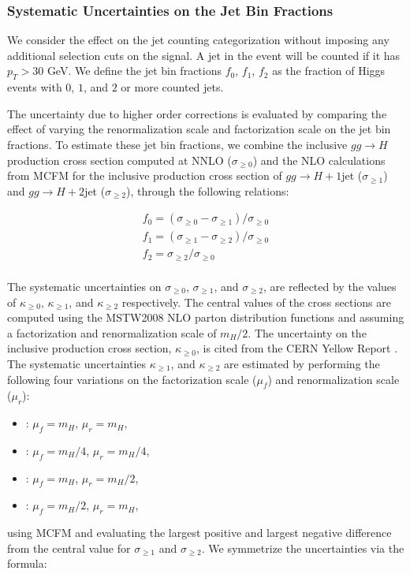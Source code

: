 \subsubsection{Systematic Uncertainties on the Jet Bin Fractions}
\label{sec:HiggsJetBinFractionSystematics}
We consider the effect on the jet counting categorization without imposing any additional
selection cuts on the signal. A jet in the event will be counted if it has $p_{T} > 30$ GeV. 
We define the jet bin fractions $f_{0}$, $f_{1}$, $f_{2}$
as the fraction of Higgs events with $0$, $1$, and $2$ or more counted jets. 

The uncertainty due to higher order corrections is evaluated by comparing the effect of
varying the renormalization scale and factorization scale on the jet bin fractions. To 
estimate these jet bin fractions, we combine the inclusive $gg \to H$ production cross section
computed at NNLO \cite{LHCHiggsCrossSectionWorkingGroup:2011ti} ($\sigma_{\geq 0}$) and the 
NLO calculations from MCFM \cite{MCFMHiggsProduction} for the inclusive production cross section 
of $gg \to H+1$jet ($\sigma_{\geq 1}$) and $gg \to H+2$jet ($\sigma_{\geq 2}$), 
through the following relations:

\begin{eqnarray}
\label{eqn:jetBinFractions}
  f_{0} = (\sigma_{\geq 0} - \sigma_{\geq 1} ) / \sigma_{\geq 0} \\
  f_{1} = (\sigma_{\geq 1} - \sigma_{\geq 2} ) / \sigma_{\geq 0} \\
  f_{2} = \sigma_{\geq 2} / \sigma_{\geq 0} \\
\end{eqnarray}

The systematic uncertainties on $\sigma_{\geq 0}$, $\sigma_{\geq 1}$, and $\sigma_{\geq 2}$, are reflected by 
the values of $\kappa_{\geq 0}$, $\kappa_{\geq 1}$, and $\kappa_{\geq 2}$ respectively. 
The central values of the cross sections are computed  using the MSTW2008 NLO parton distribution functions and 
assuming a factorization and renormalization scale of $m_{H} / 2$. The uncertainty on the inclusive
production cross section, $\kappa_{\geq 0}$, is cited from the CERN Yellow Report 
\cite{LHCHiggsCrossSectionWorkingGroup:2011ti}.  The systematic uncertainties
$\kappa_{\geq 1}$, and $\kappa_{\geq 2}$ are estimated by performing the following four variations on
the factorization scale ($\mu_{f}$) and renormalization scale ($\mu_{r}$):

\begin{itemize}
\item: $\mu_{f} = m_{H} $, $\mu_{r} = m_{H}$,
\item: $\mu_{f} = m_{H} / 4$, $\mu_{r} = m_{H} / 4$,
\item: $\mu_{f} = m_{H} $, $\mu_{r} = m_{H} / 2$,
\item: $\mu_{f} = m_{H} / 2$, $\mu_{r} = m_{H} $,

\end{itemize}
using MCFM and evaluating the largest positive and largest negative difference from the central
value for $\sigma_{\geq 1}$ and $\sigma_{\geq 2}$. We symmetrize the uncertainties via the formula:

